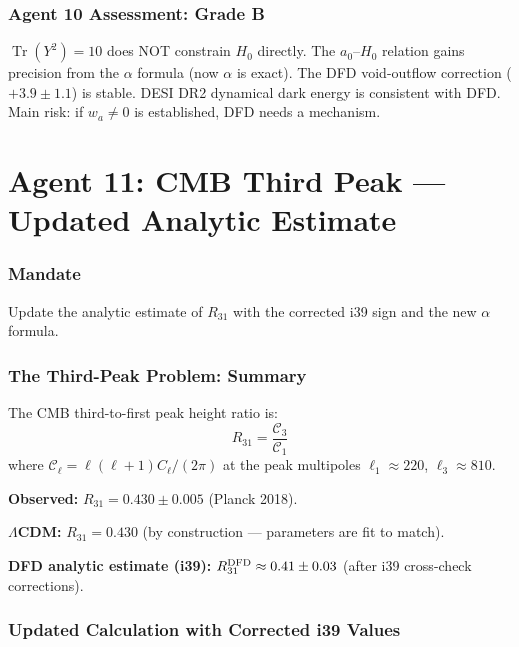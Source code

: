 \documentclass[11pt,a4paper]{article}
\newcommand{\Tr}{\operatorname{Tr}}
\begin{document}
\section{Agent 10 Assessment: Grade B}

$\Tr(Y^2) = 10$ does NOT constrain $H_0$ directly. The $a_0$--$H_0$ relation gains precision from the $\alpha$ formula (now $\alpha$ is exact). The DFD void-outflow correction ($+3.9 \pm 1.1$) is stable. DESI DR2 dynamical dark energy is consistent with DFD. Main risk: if $w_a \neq 0$ is established, DFD needs a mechanism.


\part{Agent 11: CMB Third Peak --- Updated Analytic Estimate}
\label{part:agent11}

\section{Mandate}
Update the analytic estimate of $R_{31}$ with the corrected i39 sign and the new $\alpha$ formula.

\section{The Third-Peak Problem: Summary}

The CMB third-to-first peak height ratio is:
\begin{equation}
R_{31} = \frac{\mathcal{C}_3}{\mathcal{C}_1}
\end{equation}
where $\mathcal{C}_\ell = \ell(\ell+1)C_\ell/(2\pi)$ at the peak multipoles $\ell_1 \approx 220$, $\ell_3 \approx 810$.

\textbf{Observed:} $R_{31} = 0.430 \pm 0.005$ (Planck 2018).

\textbf{$\Lambda$CDM:} $R_{31} = 0.430$ (by construction --- parameters are fit to match).

\textbf{DFD analytic estimate (i39):} $R_{31}^{\rm DFD} \approx 0.41 \pm 0.03$ (after i39 cross-check corrections).

\section{Updated Calculation with Corrected i39 Values}
\end{document}

